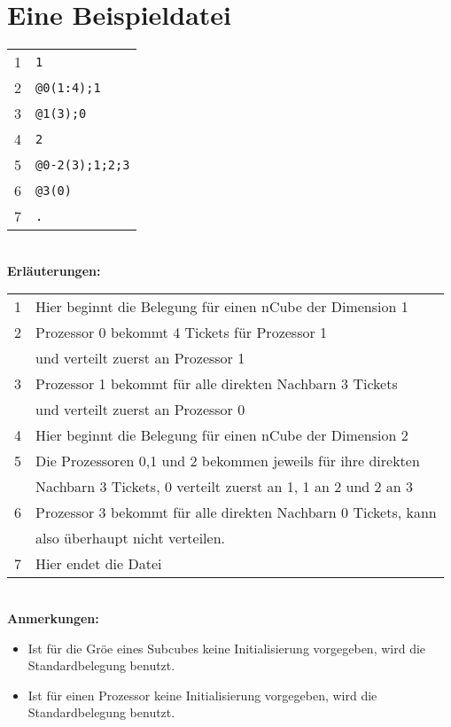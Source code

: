 \section{Eine Beispieldatei}
\begin{tabular}{ll}
1 & {\tt *1}\\ 
2 & {\tt @0(1:4);1}\\
3 & {\tt @1(3);0}\\
4 & {\tt *2}\\
5 & {\tt @0-2(3);1;2;3}\\
6 & {\tt @3(0)}\\
7 & {\tt .}\\
\end{tabular}
\\[2ex]
{\bf Erl\"auterungen:}\\
\begin{tabular}{ll}
1 & Hier beginnt die Belegung f\"ur einen nCube der Dimension 1\\
2 & Prozessor 0 bekommt 4 Tickets f\"ur Prozessor 1\\ 
  & und verteilt zuerst an Prozessor 1\\
3 & Prozessor 1 bekommt f\"ur alle direkten Nachbarn 3 Tickets\\
  & und verteilt zuerst an Prozessor 0\\
4 & Hier beginnt die Belegung f\"ur einen nCube der Dimension 2\\
5 & Die Prozessoren 0,1 und 2 bekommen jeweils f\"ur ihre direkten\\
  & Nachbarn 3 Tickets, 0 verteilt zuerst an 1, 1 an 2 und 2 an 3\\
6 & Prozessor 3 bekommt f\"ur alle direkten Nachbarn 0 Tickets, kann\\
  & also \"uberhaupt nicht verteilen.\\
7 & Hier endet die Datei\\
\end{tabular}
\\[2ex]
{\bf Anmerkungen:}
\begin{itemize}
\item Ist f\"ur die Gr\"o\3e eines Subcubes keine Initialisierung vorgegeben,
wird die Standardbelegung benutzt.
\item Ist f\"ur einen Prozessor keine Initialisierung vorgegeben, wird die
Standardbelegung benutzt.
\end{itemize}


